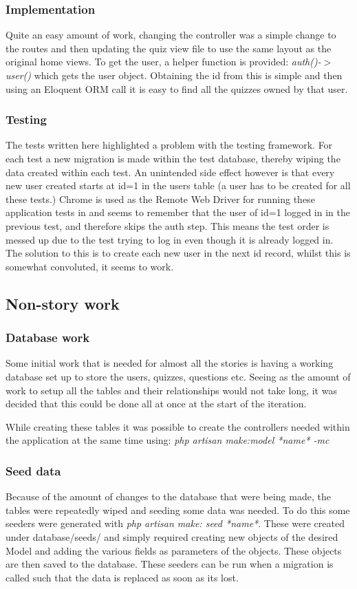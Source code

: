 \subsubsection{Implementation}
Quite an easy amount of work, changing the controller was a simple change to the routes and then updating the quiz view file to use the same layout as the original home views. To get the user, a helper function is provided: \textit{auth()-$>$user()} which gets the user object. Obtaining the id from this is simple and then using an Eloquent ORM call it is easy to find all the quizzes owned by that user.
\subsubsection{Testing}
The tests written here highlighted a problem with the testing framework. For each test a new migration is made within the test database, thereby wiping the data created within each test. An unintended side effect however is that every new user created starts at id=1 in the users table (a user has to be created for all these tests.) Chrome is used as the Remote Web Driver for running these application tests in and seems to remember that the user of id=1 logged in in the previous test, and therefore skips the auth step. This means the test order is messed up due to the test trying to log in even though it is already logged in. The solution to this is to create each new user in the next id record, whilst this is somewhat convoluted, it seems to work.
\newpage

\subsection{Non-story work}
\subsubsection{Database work}
Some initial work that is needed for almost all the stories is having a working database set up to store the users, quizzes, questions etc. Seeing as the amount of work to setup all the tables and their relationships would not take long, it was decided that this could be done all at once at the start of the iteration.

While creating these tables it was possible to create the controllers needed within the application at the same time using: \textit{php artisan make:model *name* -mc } 
\subsubsection{Seed data}
Because of the amount of changes to the database that were being made, the tables were repeatedly wiped and seeding some data was needed. To do this some seeders were generated with \textit{php artisan make: seed *name*}. These were created under database/seeds/ and simply required creating new objects of the desired Model and adding the various fields as parameters of the objects. These objects are then saved to the database. These seeders can be run when a migration is called such that the data is replaced as soon as its lost.

